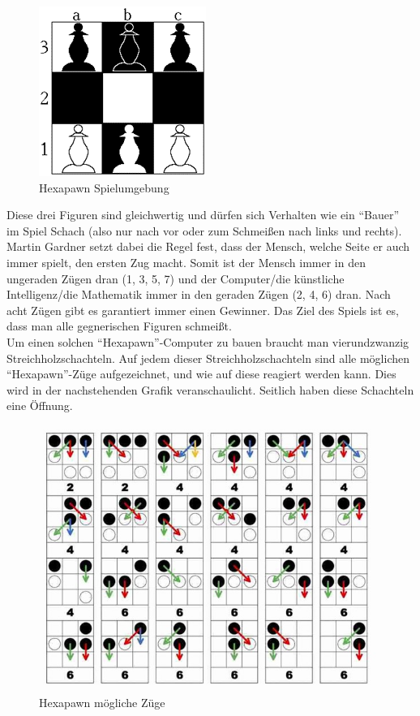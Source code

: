 \begin{figure}[H]
    \centering
    \includegraphics[scale=1]{pics/hexapawn/hexapawn_setup.png}
    \caption{Hexapawn Spielumgebung}
    \label{fig:tech:HexapawnSetup}
\end{figure}

Diese drei Figuren sind gleichwertig und dürfen sich Verhalten wie ein ``Bauer'' im Spiel Schach (also nur nach vor oder zum Schmeißen nach links und rechts). Martin Gardner setzt dabei die Regel fest, dass der Mensch, welche Seite er auch immer spielt, den ersten Zug macht. Somit ist der Mensch immer in den ungeraden Zügen dran (1, 3, 5, 7) und der Computer/die künstliche Intelligenz/die Mathematik immer in den geraden Zügen (2, 4, 6) dran. Nach acht Zügen gibt es garantiert immer einen Gewinner. Das Ziel des Spiels ist es, dass man alle gegnerischen Figuren schmeißt.
\\
Um einen solchen ``Hexapawn''-Computer zu bauen braucht man vierundzwanzig Streichholzschachteln. Auf jedem dieser Streichholzschachteln sind alle möglichen ``Hexapawn''-Züge aufgezeichnet, und wie auf diese reagiert werden kann. Dies wird in der nachstehenden Grafik veranschaulicht. Seitlich haben diese Schachteln eine Öffnung.


\begin{figure}[H]
    \centering
    \includegraphics[scale=1]{pics/hexapawn/hexapawn_zuege.jpg}
    \caption{Hexapawn mögliche Züge}
    \label{fig:tech:HexapawnZuege}
\end{figure}



